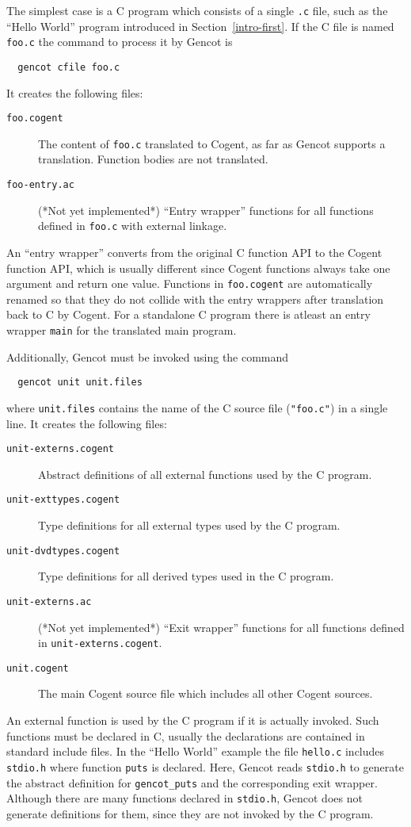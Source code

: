 \documentclass[a4paper]{report}
\newcommand{\code}[1]{\textnormal{\texttt{#1}}}
\begin{document}
The simplest case is a C program which consists of a single \code{.c} file, such as the ``Hello World'' program
introduced in Section~\ref{intro-first}. If the C file is named \code{foo.c} the command to process it by Gencot is
\begin{verbatim}
  gencot cfile foo.c
\end{verbatim}
It creates the following files:
\begin{description}
\item[\code{foo.cogent}] The content of \code{foo.c} translated to Cogent, as far as Gencot supports a translation.
Function bodies are not translated.
\item[\code{foo-entry.ac}] (*Not yet implemented*) ``Entry wrapper'' functions for all functions defined in \code{foo.c} 
with external linkage.
\end{description}

An ``entry wrapper'' converts from the original C function API to the Cogent function API, which is usually different 
since Cogent functions always take one argument and return one value. Functions in \code{foo.cogent} are automatically
renamed so that they do not collide with the entry wrappers after translation back to C by Cogent. For a standalone
C program there is atleast an entry wrapper \code{main} for the translated main program.

Additionally, Gencot must be invoked using the command
\begin{verbatim}
  gencot unit unit.files
\end{verbatim}
where \code{unit.files} contains the name of the C source file (\code{"foo.c"}) in a single line. It creates the following
files:
\begin{description}
\item[\code{unit-externs.cogent}] Abstract definitions of all external functions used by the C program.
\item[\code{unit-exttypes.cogent}] Type definitions for all external types used by the C program.
\item[\code{unit-dvdtypes.cogent}] Type definitions for all derived types used in the C program.
\item[\code{unit-externs.ac}] (*Not yet implemented*) ``Exit wrapper'' functions for all functions defined in 
\code{unit-externs.cogent}.
\item[\code{unit.cogent}] The main Cogent source file which includes all other Cogent sources.
\end{description}
An external function is used by the C program if it is actually invoked. Such functions must be declared in C, usually
the declarations are contained in standard include files. In the ``Hello World'' example the file \code{hello.c} includes
\code{stdio.h} where function \code{puts} is declared. Here, Gencot reads \code{stdio.h} to generate the abstract definition for
\code{gencot\_puts} and the corresponding exit wrapper. Although there are many functions declared in \code{stdio.h}, Gencot
does not generate definitions for them, since they are not invoked by the C program.
\end{document}
